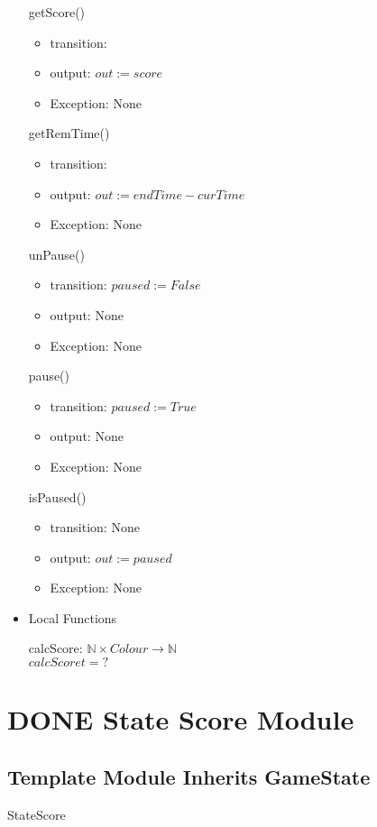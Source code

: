 \documentclass[11pt]{article}
\begin{document}
\begin{itemize}
getScore()
\begin{itemize}
\item transition:
\item output: \(out := score\)
\item Exception: None
\end{itemize}

getRemTime()
\begin{itemize}
\item transition:
\item output: \(out := endTime - curTime\)
\item Exception: None
\end{itemize}

unPause()
\begin{itemize}
\item transition: \(paused := False\)
\item output: None
\item Exception: None
\end{itemize}

pause()
\begin{itemize}
\item transition: \(paused := True\)
\item output: None
\item Exception: None
\end{itemize}

isPaused()
\begin{itemize}
\item transition: None
\item output: \(out := paused\)
\item Exception: None
\end{itemize}

\item Local Functions
\label{sec:orge62ddc3}

calcScore: \(\mathbb{N} \times Colour \rightarrow \mathbb{N}\) \\
\(calcScore t = ?\)

\newpage
\end{itemize}
\section{{\bfseries\sffamily DONE} State Score Module}
\label{sec:org96677f0}
\subsection*{Template Module Inherits GameState}
\label{sec:orgeca4517}
StateScore
\end{document}
